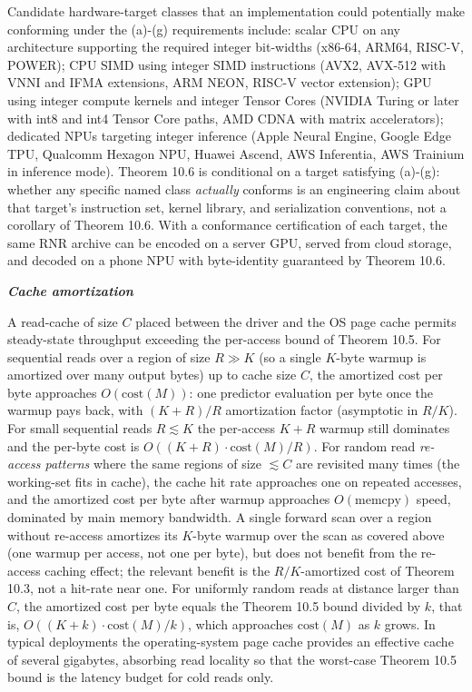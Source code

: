 \documentclass[
]{article}
\begin{document}
Candidate hardware-target classes that an implementation could
potentially make conforming under the (a)-(g) requirements include:
scalar CPU on any architecture supporting the required integer
bit-widths (x86-64, ARM64, RISC-V, POWER); CPU SIMD using integer
SIMD instructions (AVX2, AVX-512 with VNNI and IFMA extensions, ARM
NEON, RISC-V vector extension); GPU using integer compute kernels
and integer Tensor Cores (NVIDIA Turing or later with int8 and int4
Tensor Core paths, AMD CDNA with matrix accelerators); dedicated
NPUs targeting integer inference (Apple Neural Engine, Google Edge
TPU, Qualcomm Hexagon NPU, Huawei Ascend, AWS Inferentia, AWS
Trainium in inference mode). Theorem 10.6 is conditional on a
target satisfying (a)-(g): whether any specific named class
\emph{actually} conforms is an engineering claim about that
target's instruction set, kernel library, and serialization
conventions, not a corollary of Theorem 10.6. With a conformance
certification of each target, the same RNR archive can be encoded
on a server GPU, served from cloud storage, and decoded on a phone
NPU with byte-identity guaranteed by Theorem 10.6.

\emph{\textbf{Cache amortization}}

A read-cache of size $C$ placed between the driver and the OS page
cache permits steady-state throughput exceeding the per-access bound
of Theorem 10.5. For sequential reads over a region of size $R \gg
K$ (so a single $K$-byte warmup is amortized over many output
bytes) up to cache size $C$, the amortized cost per byte approaches
$O(\mathrm{cost}(M))$: one predictor evaluation per byte once the
warmup pays back, with $(K + R)/R$ amortization factor (asymptotic
in $R/K$). For small sequential reads $R \lesssim K$ the
per-access $K + R$ warmup still dominates and the per-byte cost is
$O((K + R) \cdot \mathrm{cost}(M) / R)$. For random read \emph{re-access patterns} where the same regions
of size $\lesssim C$ are revisited many times (the working-set fits
in cache), the cache hit rate approaches one on repeated accesses,
and the amortized cost per byte after warmup approaches
$O(\mathrm{memcpy})$ speed, dominated by main memory bandwidth.
A single forward scan over a region without re-access amortizes
its $K$-byte warmup over the scan as covered above (one warmup
per access, not one per byte), but does not benefit from the
re-access caching effect; the relevant benefit is the
$R/K$-amortized cost of Theorem 10.3, not a hit-rate near one. For
uniformly random reads at distance larger than $C$, the amortized
cost per byte equals the Theorem 10.5 bound divided by $k$, that is,
$O((K + k) \cdot \mathrm{cost}(M) / k)$, which approaches
$\mathrm{cost}(M)$ as $k$ grows. In typical deployments the
operating-system page cache provides an effective cache of several
gigabytes, absorbing read locality so that the worst-case Theorem
10.5 bound is the latency budget for cold reads only.
\end{document}
